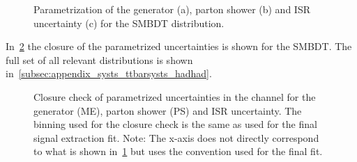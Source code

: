 \begin{figure}[htbp]
  \centering


  \caption{Parametrization of the generator (a), parton shower (b) and
    ISR uncertainty (c) for the SMBDT distribution.}
  \label{fig:hadhad_ttbar_syst_parametrization}
\end{figure}

In~\ref{fig:hadhad_ttbar_syst_closure} the closure of the
parametrized uncertainties is shown for the SMBDT. The full set of all
relevant distributions is shown
in~\ref{subsec:appendix_systs_ttbarsysts_hadhad}.


\begin{figure}[htbp]
  \caption{Closure check of parametrized \ttbar uncertainties in the
    \hadhad channel for the generator (ME), parton shower (PS) and ISR
    uncertainty. The binning used for the closure check is the same as
    used for the final signal extraction fit. Note: The x-axis does
    not directly correspond to what is shown 
    in~\ref{fig:hadhad_ttbar_syst_parametrization} but uses the
    convention used for the final fit.}
  \label{fig:hadhad_ttbar_syst_closure}
\end{figure}


